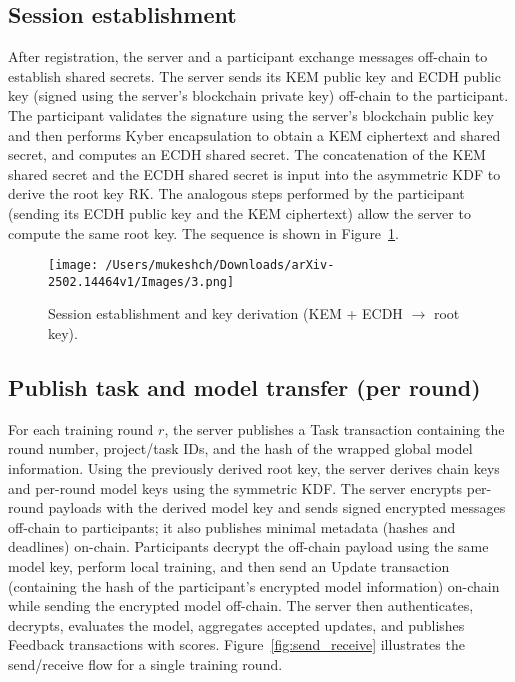 \documentclass[11pt]{article}
\begin{document}
\subsection*{Session establishment}
After registration, the server and a participant exchange messages off-chain to establish shared secrets. The server sends its KEM public key and ECDH public key (signed using the server's blockchain private key) off-chain to the participant. The participant validates the signature using the server's blockchain public key and then performs Kyber encapsulation to obtain a KEM ciphertext and shared secret, and computes an ECDH shared secret. The concatenation of the KEM shared secret and the ECDH shared secret is input into the asymmetric KDF to derive the root key $\mathrm{RK}$. The analogous steps performed by the participant (sending its ECDH public key and the KEM ciphertext) allow the server to compute the same root key. The sequence is shown in Figure~\ref{fig:session}.

\begin{figure}[H]
  \centering
  \texttt{[image: /Users/mukeshch/Downloads/arXiv-2502.14464v1/Images/3.png]}
  \caption{Session establishment and key derivation (KEM + ECDH $\rightarrow$ root key).}
  \label{fig:session}
\end{figure}

\subsection*{Publish task and model transfer (per round)}
For each training round $r$, the server publishes a Task transaction containing the round number, project/task IDs, and the hash of the wrapped global model information. Using the previously derived root key, the server derives chain keys and per-round model keys using the symmetric KDF. The server encrypts per-round payloads with the derived model key and sends signed encrypted messages off-chain to participants; it also publishes minimal metadata (hashes and deadlines) on-chain. Participants decrypt the off-chain payload using the same model key, perform local training, and then send an Update transaction (containing the hash of the participant's encrypted model information) on-chain while sending the encrypted model off-chain. The server then authenticates, decrypts, evaluates the model, aggregates accepted updates, and publishes Feedback transactions with scores. Figure~\ref{fig:send_receive} illustrates the send/receive flow for a single training round.
\end{document}
